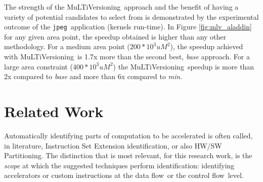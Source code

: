 \documentclass[]{usiinfthesis}
\newcommand{\multi}{MuLTiVersioning}
\newcommand{\dataflow}{data flow}
\newcommand{\controlflow}{control flow}
\newcommand{\jpeg}{\texttt{jpeg}}
\begin{document}
The strength of the \multi\ approach and the benefit of having 
a variety of potential candidates to select from 
is demonstrated by the experimental outcome of the \jpeg\ application (kernels run-time). 
In Figure \ref{fig:mlv_aladdin} for any given area point, the speedup obtained is higher than any other 
methodology. For a medium area point ($200 * 10^3 uM^2$), the 
speedup achieved with \multi\ is 1.7x more than the second best, \emph{base} approach. For 
a large area constraint ($400 * 10^3 uM^2$) the \multi\ speedup is more than 2x compared to
\emph{base} and more than 6x compared to \emph{min}.\par






\section{Related Work}
\label{sec:rw}

Automatically identifying parts of computation to be
accelerated is often called, in literature, Instruction Set Extension
identification, or also HW/SW Partitioning. The distinction that is most 
relevant, for this research work, is the
\emph{scope} at which the suggested techniques perform identification: 
identifying accelerators or custom instructions at the \dataflow\ or
the \controlflow\ level.\par
\end{document}
